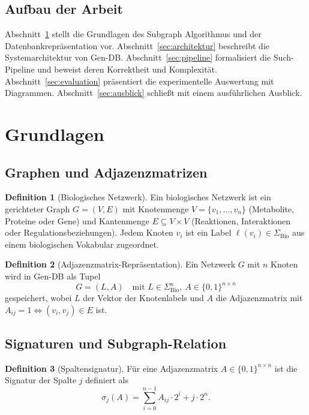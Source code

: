 \documentclass[a4paper,12pt]{article}
\theoremstyle{definition}
\newtheorem{definition}{Definition}
\begin{document}
\subsection{Aufbau der Arbeit}

Abschnitt~\ref{sec:grundlagen} stellt die Grundlagen des Subgraph Algorithmus und der Datenbankrepräsentation vor. Abschnitt~\ref{sec:architektur} beschreibt die Systemarchitektur von Gen-DB. Abschnitt~\ref{sec:pipeline} formalisiert die Such-Pipeline und beweist deren Korrektheit und Komplexität. Abschnitt~\ref{sec:evaluation} präsentiert die experimentelle Auswertung mit Diagrammen. Abschnitt~\ref{sec:ausblick} schließt mit einem ausführlichen Ausblick.

\section{Grundlagen}
\label{sec:grundlagen}

\subsection{Graphen und Adjazenzmatrizen}

\begin{definition}[Biologisches Netzwerk]
	Ein biologisches Netzwerk ist ein gerichteter Graph $G = (V, E)$ mit Knotenmenge $V = \{v_1, \ldots, v_n\}$ (Metabolite, Proteine oder Gene) und Kantenmenge $E \subseteq V \times V$ (Reaktionen, Interaktionen oder Regulationsbeziehungen). Jedem Knoten $v_i$ ist ein Label $\ell(v_i) \in \Sigma_{\text{Bio}}$ aus einem biologischen Vokabular zugeordnet.
\end{definition}

\begin{definition}[Adjazenzmatrix-Repräsentation]
	Ein Netzwerk $G$ mit $n$ Knoten wird in Gen-DB als Tupel
	\[
	G = (L, A) \quad \text{mit } L \in \Sigma_{\text{Bio}}^n,\ A \in \{0,1\}^{n \times n}
	\]
	gespeichert, wobei $L$ der Vektor der Knotenlabels und $A$ die Adjazenzmatrix mit $A_{ij} = 1 \Leftrightarrow (v_i, v_j) \in E$ ist.
\end{definition}

\subsection{Signaturen und Subgraph-Relation}

\begin{definition}[Spaltensignatur]
	Für eine Adjazenzmatrix $A \in \{0,1\}^{n \times n}$ ist die Signatur der Spalte $j$ definiert als
	\[
	\sigma_j(A) = \sum_{i=0}^{n-1} A_{ij} \cdot 2^i + j \cdot 2^n.
	\]
\end{definition}
\end{document}
